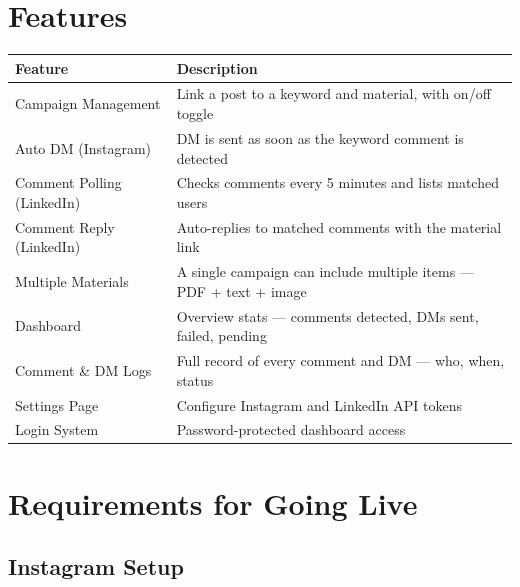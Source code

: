 \documentclass[12pt,a4paper]{article}
\begin{document}
\section{Features}

\begin{tabularx}{\textwidth}{lX}
\toprule
\textbf{Feature} & \textbf{Description} \\
\midrule
Campaign Management & Link a post to a keyword and material, with on/off toggle \\[0.3em]
Auto DM (Instagram) & DM is sent as soon as the keyword comment is detected \\[0.3em]
Comment Polling (LinkedIn) & Checks comments every 5 minutes and lists matched users \\[0.3em]
Comment Reply (LinkedIn) & Auto-replies to matched comments with the material link \\[0.3em]
Multiple Materials & A single campaign can include multiple items --- PDF + text + image \\[0.3em]
Dashboard & Overview stats --- comments detected, DMs sent, failed, pending \\[0.3em]
Comment \& DM Logs & Full record of every comment and DM --- who, when, status \\[0.3em]
Settings Page & Configure Instagram and LinkedIn API tokens \\[0.3em]
Login System & Password-protected dashboard access \\
\bottomrule
\end{tabularx}

\section{Requirements for Going Live}

\subsection{Instagram Setup}
\end{document}
